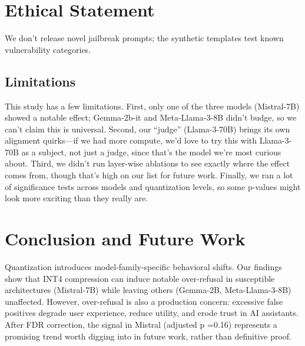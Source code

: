 \documentclass[11pt]{article}
\begin{document}
\section{Ethical Statement}
We don't release novel jailbreak prompts; the synthetic templates test known vulnerability categories.

\subsection{Limitations}
This study has a few limitations. First, only one of the three models (Mistral-7B) showed a notable effect; Gemma-2b-it and Meta-Llama-3-8B didn’t budge, so we can’t claim this is universal. Second, our “judge” (Llama-3-70B) brings its own alignment quirks—if we had more compute, we’d love to try this with Llama-3-70B as a subject, not just a judge, since that’s the model we’re most curious about. Third, we didn’t run layer-wise ablations to see exactly where the effect comes from, though that’s high on our list for future work. Finally, we ran a lot of significance tests across models and quantization levels, so some p-values might look more exciting than they really are.

\section{Conclusion and Future Work}
Quantization introduces model-family-specific behavioral shifts. Our findings show that INT4 compression can induce notable over-refusal in susceptible architectures (Mistral-7B) while leaving others (Gemma-2B, Meta-Llama-3-8B) unaffected. However, over-refusal is also a production concern: excessive false positives degrade user experience, reduce utility, and erode trust in AI assistants. After FDR correction, the signal in Mistral (adjusted p =0.16) represents a promising trend worth digging into in future work, rather than definitive proof. 

\begin{center}
\end{center}
\end{document}
